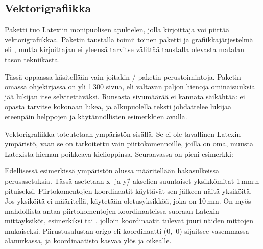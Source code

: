 \subsection{Vektorigrafiikka}

Paketti  tuo Latexiin monipuolisen apukielen, jolla
kirjoittaja voi piirtää vektorigrafiikkaa. Paketin taustalla toimii
toinen paketti ja grafiikkajärjestelmä  eli
, mutta kirjoittajan ei yleensä
tarvitse välittää taustalla olevasta matalan tason tekniikasta.

Tässä oppaassa käsitellään vain joitakin \-/ paketin
perustoimintoja. Paketin omassa ohjekirjassa on yli 1\,300 sivua, eli
valtavan paljon hienoja ominaisuuksia jää lukijan itse selvitettäväksi.
Runsasta sivumäärää ei kannata säikähtää: ei opasta tarvitse kokonaan
lukea, ja alkupuolella teksti johdattelee lukijaa eteenpäin helppojen ja
käytännöllisten esimerkkien avulla.

Vektorigrafiikka toteutetaan ympäristön  sisällä.
Se ei ole tavallinen Latexin ympäristö, vaan se on tarkoitettu vain
piirtokomennoille, joilla on oma, muusta Latexista hieman poikkeava
kielioppinsa. Seuraavassa on pieni esimerkki:

\begin{koodilohkosis}
\end{koodilohkosis}

\begin{tulossis}
\end{tulossis}

\noindent
Edellisessä esimerkissä ympäristön alussa määritellään hakasulkeissa
perusasetuksia. Tässä asetetaan x- ja y\=/ akselien suuntaiset
yksikkömitat 1\,mm:n pituiseksi. Piirtokomentojen koordinaatit käyttävät
sen jälkeen näitä yksiköitä. Jos yksiköitä ei määritellä, käytetään
oletusyksikköä, joka on 10\,mm. On myös mahdollista antaa
piirtokomentojen koordinaateissa suoraan Latexin mittayksiköt,
esimerkiksi \koodi{(25mm,5mm)} tai \koodi{(10bp,20bp)}, jolloin
koordinaatit tulevat juuri näiden mittojen mukaiseksi. Piirustusalustan
origo eli koordinaatti (0,~0) sijaitsee vasemmassa alanurkassa, ja
koordinaatisto kasvaa ylös ja oikealle.

